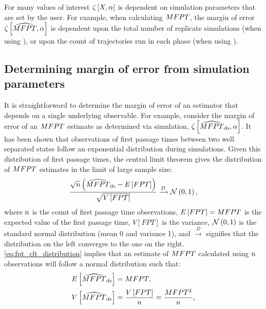 For many values of interest $\zeta \left[ X, \alpha \right]$ is dependent on simulation parameters that are set by the user. For example, when calculating $MFPT$, the margin of error $\zeta \left[ \widehat{MFPT}, \alpha \right]$ is dependent upon the total number of replicate simulations (when using ), or upon the count of trajectories run in each phase (when using ).


\subsection{Determining margin of error from simulation parameters}
\label{sec:moe_from_simulation_params}
It is straightforward to determine the margin of error of an estimator that depends on a single underlying observable. For example, consider the margin of error of an $MFPT$ estimate as determined via  simulation, $\zeta \left[ \widehat{MFPT}_{\text{ds}}, \alpha \right]$. It has been shown that observations of first passage times between two well separated states follow an exponential distribution during  simulations\supercite{Becker:2012ej}. Given this distribution of first passage times, the central limit theorem\supercite{Olive:2014by} gives the distribution of $MFPT$ estimates in the limit of large sample size:
    \begin{equation}
    \label{eq:fpt_clt_distribution}
        \frac{\sqrt{n} \left(\widehat{MFPT}_{\text{ds}} - E \left[ FPT \right]\right) }{\sqrt{V \left[ FPT \right]}} \xrightarrow{D} \mathcal{N}\left( 0 , 1 \right),
    \end{equation}
where $n$ is the count of first passage time observations, $E \left[ FPT \right] = MFPT$ is the expected value of the first passage time, $V[FPT]$ is the variance, $\mathcal{N}\left( 0 , 1 \right)$ is the standard normal distribution (\ie mean 0 and variance 1), and $\xrightarrow{D}$ signifies that the distribution on the left converges to the one on the right. \eqref{eq:fpt_clt_distribution} implies\supercite{Olive:2014by} that an estimate of $MFPT$ calculated using $n$ observations will follow a normal distribution such that:
    \begin{align}
        \label{eq:mfptestds_moments}
        \begin{split}
            E \left[ \widehat{MFPT}_{\text{ds}} \right] &= MFPT, \\
            V \left[ \widehat{MFPT}_{\text{ds}} \right] &= \frac{V \left[ FPT \right]}{n} = \frac{MFPT^2}{n},
        \end{split}
    \end{align}
